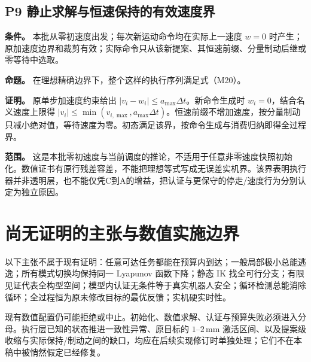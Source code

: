 \subsection{P9 静止求解与恒速保持的有效速度界}
\textbf{条件。} 本批从零初速度出发；每次新运动命令均在实际上一速度 $w=0$ 时产生；原加速度边界和裁剪有效；实际命令只从该新提案、其恒速前缀、分量制动后继或零等待中选取。

\textbf{命题。} 在理想精确边界下，整个这样的执行序列满足式（M20）。

\textbf{证明。} 原单步加速度约束给出 $|v_i-w_i|\le a_{\max}\Delta t$。新命令生成时 $w_i=0$，结合名义速度上限得 $|v_i|\le\min(v_{i,\max},a_{\max}\Delta t)$。恒速前缀不增加速度，按分量制动只减小绝对值，等待速度为零。初态满足该界，按命令生成与消费归纳即得全过程界。

\textbf{范围。} 这是本批零初速度与当前调度的推论，不适用于任意非零速度快照初始化。数值证书有原行残差容差，不能把理想等式写成无误差实机界。该界表明执行器并非透明层，也不能仅凭C到A的增益，把认证与更保守的停走/速度行为分别认定为独立原因。

\section{尚无证明的主张与数值实施边界}
以下主张不属于现有证明：任意可达任务都能在预算内到达；一般局部极小总能逃逸；所有模式切换均保持同一 Lyapunov 函数下降；静态 IK 找全可行分支；有限见证代表全构型空间；模型内认证无条件等于真实机器人安全；循环检测总能消除循环；全过程恒为原未修改目标的最优反馈；实机硬实时性。

现有数值配置仍可能拒绝或中止。初始化、数值求解、认证与预算失败必须进入分母。执行层已知的状态推进一致性异常、原目标的 $1$--$2\,\mathrm{mm}$ 激活区间、以及提案级收缩与实际保持/制动之间的缺口，均应在后续实现修订时单独处理；它们不在本稿中被悄然假定已经修复。
